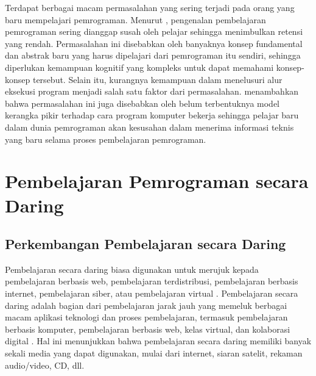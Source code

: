 Terdapat berbagai macam permasalahan yang sering terjadi pada orang yang baru mempelajari pemrograman. Menurut \textcite{moons2013pilot}, pengenalan pembelajaran pemrograman sering dianggap susah oleh pelajar sehingga menimbulkan retensi yang rendah. Permasalahan ini disebabkan oleh banyaknya konsep fundamental dan abstrak baru yang harus dipelajari dari pemrograman itu sendiri, sehingga diperlukan kemampuan kognitif yang kompleks untuk dapat memahami konsep-konsep tersebut. Selain itu, kurangnya kemampuan dalam menelusuri alur eksekusi program menjadi salah satu faktor dari permasalahan. \textcite{mayer1981psychology} menambahkan bahwa permasalahan ini juga disebabkan oleh belum terbentuknya model kerangka pikir terhadap cara program komputer bekerja sehingga pelajar baru dalam dunia pemrograman akan kesusahan dalam menerima informasi teknis yang baru selama proses pembelajaran pemrograman.



\section{Pembelajaran Pemrograman secara Daring}
\subsection{Perkembangan Pembelajaran secara Daring}
Pembelajaran secara daring biasa digunakan untuk merujuk kepada pembelajaran berbasis web, pembelajaran terdistribusi, pembelajaran berbasis internet, pembelajaran siber, atau pembelajaran virtual \parencite{urdan2000elearning}. Pembelajaran secara daring adalah bagian dari pembelajaran jarak jauh yang memeluk berbagai macam aplikasi teknologi dan proses pembelajaran, termasuk pembelajaran berbasis komputer, pembelajaran berbasis web, kelas virtual, dan kolaborasi digital \parencite{urdan2000elearning}. Hal ini menunjukkan bahwa pembelajaran secara daring memiliki banyak sekali media yang dapat digunakan, mulai dari internet, siaran satelit, rekaman audio/video, CD, dll.


